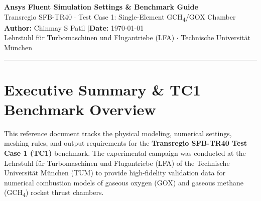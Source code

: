 \documentclass[11pt,a4paper]{article}
\begin{document}
\begin{center}
    {\LARGE\bfseries\color{tumdarkblue} Ansys Fluent Simulation Settings \& Benchmark Guide} \\[0.4em]
    {\Large\color{tumblue} Transregio SFB-TR40 $\cdot$ Test Case 1: Single-Element GCH\textsubscript{4}/GOX Chamber} \\[0.6em]
    {\normalsize\textbf{Author:} Chinmay S Patil \quad$\vert$\quad \textbf{Date:} \today} \\[0.3em]
    {\footnotesize\color{tumgray} Lehrstuhl f\"ur Turbomaschinen und Flugantriebe (LFA) $\cdot$ Technische Universit\"at M\"unchen}
\end{center}
\vspace{-0.5em}
\noindent\textcolor{tumblue}{\rule{\textwidth}{1.2pt}}
\vspace{0.8em}

\section{Executive Summary \& TC1 Benchmark Overview}
This reference document tracks the physical modeling, numerical settings, meshing rules, and output requirements for the \textbf{Transregio SFB-TR40 Test Case 1 (TC1)} benchmark. The experimental campaign was conducted at the Lehrstuhl f\"ur Turbomaschinen und Flugantriebe (LFA) of the Technische Universit\"at M\"unchen (TUM) to provide high-fidelity validation data for numerical combustion models of gaseous oxygen (GOX) and gaseous methane (GCH\textsubscript{4}) rocket thrust chambers.
\end{document}
